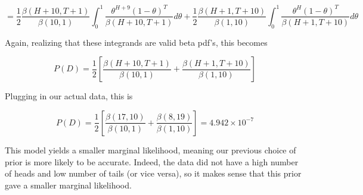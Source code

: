 \documentclass[submit]{harvardml}
\begin{document}
\begin{enumerate}
$$= \frac{1}{2} \frac{\beta(H+10,T+1)}{\beta(10,1)}\int_0^1 \frac{\theta^{H+9}(1-\theta)^T}{\beta(H+10,T+1)} d\theta + \frac{1}{2} \frac{\beta(H+1,T+10)}{\beta(1,10)}\int_0^1 \frac{\theta^H(1-\theta)^T}{\beta(H+1,T+10)}  d\theta$$

Again, realizing that these integrands are valid beta pdf's, this becomes

$$ P(D) = \frac{1}{2} [\frac{\beta(H+10,T+1)}{\beta(10,1)} + \frac{\beta(H+1,T+10)}{\beta(1,10)}] $$

Plugging in our actual data, this is

$$ \boxed{P(D) = \frac{1}{2} [\frac{\beta(17,10)}{\beta(10,1)} + \frac{\beta(8,19)}{\beta(1,10)}] = 4.942 \times 10^{-7}}$$

This model yields a smaller marginal likelihood, meaning our previous choice of prior is more likely to be accurate. Indeed, the data did not have a high number of heads and low number of tails (or vice versa), so it makes sense that this prior gave a smaller marginal likelihood.

\end{enumerate}
\end{document}

